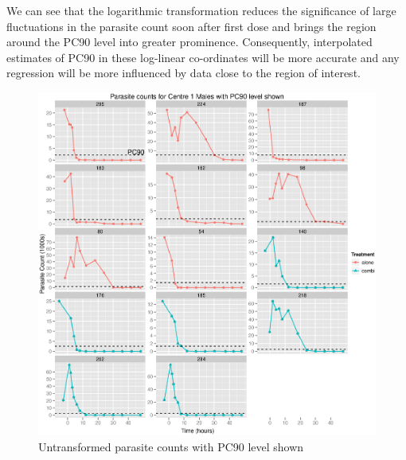 We can see that the logarithmic transformation reduces the significance of large fluctuations in the parasite count soon after first dose and brings the region around the PC90 level into greater prominence. Consequently, interpolated estimates of PC90 in these log-linear co-ordinates will be more accurate and any regression will be more influenced by data close to the region of interest.  
\begin{figure}[p]
\begin{center}
\includegraphics[width=6.1in]{raw901M.eps}
\caption{Untransformed parasite counts with PC90 level shown}
\label{raw901M}
\end{center}
\end{figure}
